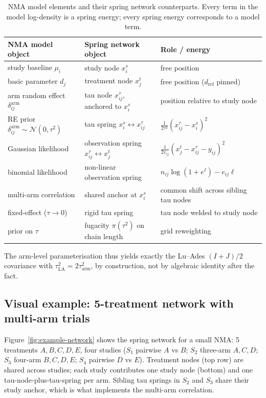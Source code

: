 \documentclass[12pt]{article}
\begin{document}
\begin{table}[h]
\centering
\small
\begin{tabular}{lll}
\toprule
NMA model object & Spring network object & Role / energy \\
\midrule
study baseline $\mu_i$ & study node $x^s_i$ & free position \\
basic parameter $d_j$ & treatment node $x^t_j$ &
free position ($d_{\text{ref}}$ pinned) \\
arm random effect $\delta^{\text{arm}}_{ij}$ &
tau node $x^{\tau}_{ij}$, anchored to $x^s_i$ &
position relative to study node \\
RE prior
$\delta^{\text{arm}}_{ij} \sim \mathcal{N}(0, \tau^2)$ &
tau spring $x^s_i \leftrightarrow x^{\tau}_{ij}$ &
$\tfrac{1}{2\tau^2}(x^{\tau}_{ij} - x^s_i)^2$ \\
Gaussian likelihood &
observation spring $x^{\tau}_{ij} \leftrightarrow x^t_j$ &
$\tfrac{1}{2v_{ij}}(x^t_j - x^{\tau}_{ij} - y_{ij})^2$ \\
binomial likelihood &
non-linear observation spring & $n_{ij}\log(1+e^{\ell})-e_{ij}\ell$ \\
multi-arm correlation &
shared anchor at $x^s_i$ &
common shift across sibling tau nodes \\
fixed-effect ($\tau \to 0$) & rigid tau spring & tau node welded to study node \\
prior on $\tau$ & fugacity $\pi(\tau^2)$ on chain length & grid reweighting \\
\bottomrule
\end{tabular}
\caption{NMA model elements and their spring network
counterparts. Every term in the model log-density is a spring
energy; every spring energy corresponds to a model term.}
\label{tab:correspondence}
\end{table}

The arm-level parameterisation thus yields exactly the
Lu--Ades $(I+J)/2$ covariance with
$\tau^2_{\text{LA}} = 2\tau^2_{\text{arm}}$, by construction, not by
algebraic identity after the fact.

\subsection{Visual example: 5-treatment network with multi-arm trials}
\label{sec:visual-example}

Figure~\ref{fig:example-network} shows the spring network for a
small NMA: 5 treatments $A, B, C, D, E$, four studies
($S_1$ pairwise $A$ vs $B$; $S_2$ three-arm $A, C, D$; $S_3$
four-arm $B, C, D, E$; $S_4$ pairwise $D$ vs $E$). Treatment
nodes (top row) are shared across studies; each study contributes
one study node (bottom) and one tau-node-plus-tau-spring per arm.
Sibling tau springs in $S_2$ and $S_3$ share their study anchor,
which is what implements the multi-arm correlation.
\end{document}
